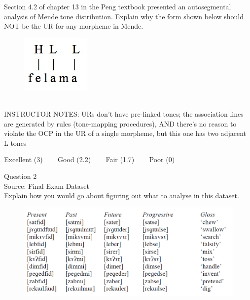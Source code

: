 \documentclass[12pt]{article}
\begin{document}
Section 4.2 of chapter 13 in the Peng textbook presented an autosegmental analysis of Mende tone distribution. Explain why the form shown below should NOT be the UR for any morpheme in Mende.\\

\begin{figure}[H]
\includegraphics{../images/mende_junction_c.png}
\end{figure}

~\\
INSTRUCTOR NOTES: URs don't have pre-linked tones; the association lines are generated by rules (tone-mapping procedures), AND there's no reason to violate the OCP in the UR of a single morpheme, but this one has two adjacent L tones


\vfill
Excellent (3) ~~~ Good (2.2) ~~~ Fair (1.7) ~~~ Poor (0)
\newpage

{\large Question 2}\\

Source: Final Exam Dataset\\

Explain how you would go about figuring out what to analyse in this dataset.\\

\begin{figure}[H]
\includegraphics{../images/final_dataset.png}
\end{figure}
\end{document}
